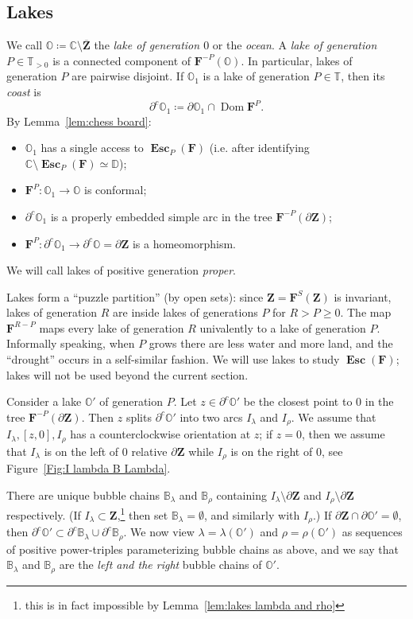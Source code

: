 \documentclass{amsart}
\newcommand{\Dom}{\operatorname {Dom}}
\newcommand{\1}{{\mathbb 1 }}
\newcommand\PT{\mathbb{ T}}
\newcommand{\bB}{{\mathbb{B}}}
\newcommand{\bO}{{\mathbb{O}}}
\newcommand{\bF}{{\mathbf F}}
\newcommand{\bZ}{{\mathbf Z}}
\newcommand{\C}{\mathbb{C}}
\newcommand{\Disk}{\mathbb{D}}
\theoremstyle{remark}
\numberwithin{equation}{section}
\theoremstyle{definition}
\newcommand{\Esc}{{\boldsymbol{\operatorname{Esc}}}}
\theoremstyle{nonumberbreak}
\begin{document}
\subsection{Lakes}
\label{ss:Lakes}
We call $\bO\coloneqq \C\setminus \overline \bZ$ the \emph{lake of generation $0$} or the \emph{ocean}. A \emph{lake of generation $P\in \PT_{>0}$} is a connected component of $\bF^{-P}(\bO)$. In particular, lakes of generation $P$ are pairwise disjoint. If $\bO_1$ is a lake of generation $P\in \PT$, then its \emph{coast}  is \[\partial^c \bO_1\coloneqq  \partial \bO_1\cap \Dom \bF^P.\] By Lemma~\ref{lem:chess board}:
\begin{itemize}
\item $\bO_1$ has a single access to $\Esc_P (\bF)$ (i.e. after identifying $\C\setminus \Esc_P(\bF)\simeq \Disk$);
\item $\bF^P\colon \bO_1\to \bO$ is conformal;
\item $\partial^c \bO_1$ is a properly embedded simple arc in the tree $\bF^{-P}(\partial \bZ)$;
\item $\bF^P\colon \partial^c \bO_1\to \partial^c\bO=\partial \bZ$ is a homeomorphism.
\end{itemize} 
 We will call lakes of positive generation \emph{proper}. 

Lakes form a ``puzzle partition'' (by open sets): since $\bZ=\bF^S(\bZ)$ is invariant, lakes of generation $R$ are inside lakes of generations $P$ for $R>P\ge 0$. The map $\bF^{R-P}$ maps every lake of generation $R$ univalently to a lake of generation $P$. Informally speaking, when $P$ grows there are less water and more land, and the ``drought'' occurs in a self-similar fashion. We will use lakes to study $\Esc(\bF)$; lakes will not be used beyond the current section.






Consider a lake $\bO'$ of generation $P$. Let $z\in \partial^c \bO'$ be the closest point to $0$ in the tree $\bF^{-P}(\partial \bZ)$. Then $z$ splits $ \partial^c \bO'$ into two arcs $I_\lambda$ and $I_\rho$. We assume that $I_\lambda,[z,0],I_\rho$ has a counterclockwise orientation at $z$; if $z=0$, then we assume that $I_\lambda$ is on the left of $0$ relative $\partial \bZ$ while $I_\rho$ is on the right of $0$, see Figure~\ref{Fig:I lambda B Lambda}.


There are unique bubble chains $\bB_\lambda$ and $\bB_\rho$ containing $I_\lambda\setminus \partial \bZ$ and $I_\rho\setminus \partial \bZ $ respectively. (If $I_\lambda\subset \bZ$,\footnote{this is in fact impossible by Lemma~\ref{lem:lakes lambda and rho}} then set $\bB_\lambda=\emptyset$, and similarly with $I_\rho$.) If $\partial \bZ\cap \partial \bO'=\emptyset$, then
 $\partial^c \bO'\subset \partial^c\bB_\lambda \cup  \partial^c\bB_\rho.$
 We now view $\lambda=\lambda(\bO')$ and $\rho=\rho(\bO')$ as sequences of positive power-triples parameterizing bubble chains as above, and we say that $\bB_\lambda$ and $\bB_\rho$ are the \emph{left and the right} bubble chains of $\bO'$.
\end{document}

